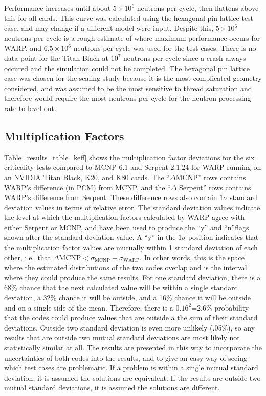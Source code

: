 \documentclass[preprint,12pt]{elsarticle}
\begin{document}
Performance increases until about $5\times10^6$ neutrons per cycle, then flattens above this for all cards.  This curve was calculated using the hexagonal pin lattice test case, and may change if a different model were input.  Despite this, $5\times10^6$ neutrons per cycle is a rough estimate of where maximum performance occurs for WARP, and $6.5\times10^6$ neutrons per cycle was used for the test cases.  There is no data point for the Titan Black at $10^7$ neutrons per cycle since a crash always occured and the simulation could not be completed.  The hexagonal pin lattice case was chosen for the scaling study because it is the most complicated geometry considered, and was assumed to be the most sensitive to thread saturation and therefore would require the most neutrons per cycle for the neutron processing rate to level out.  

\subsection{Multiplication Factors}

Table~\ref{results_table_keff} shows the multiplication factor deviations for the six criticality tests compared to MCNP 6.1 and Serpent 2.1.24 for WARP running on an NVIDIA Titan Black, K20, and K80 cards.  The ``$\Delta$MCNP'' rows contains WARP's difference (in PCM) from MCNP, and the ``$\Delta$ Serpent'' rows contains WARP's difference from Serpent.  These difference rows also contain $1\sigma$ standard deviation values in terms of relative error. The standard deviation values indicate the level at which the multiplication factors calculated by WARP agree with either Serpent or MCNP, and have been used to produce the ``y'' and ``n''flags shown after the standard deviation value.  A ``y'' in the $1\sigma$ position indicates that the multiplication factor values are mutually within 1 standard deviation of each other, i.e.\ that $\Delta \textrm{MCNP}<\sigma_{\textrm{MCNP}}+\sigma_{\textrm{WARP}}$.  In other words, this is the space where the estimated distributions of the two codes overlap and is the interval where they could produce the same results.  For one standard deviation, there is a 68\% chance that the next calculated value will be within a single standard deviation, a 32\% chance it will be outside, and a 16\% chance it will be outside and on a single side of the mean.  Therefore, there is a $0.16^2$=2.6\% probability that the codes could produce values that are outside a the sum of their standard deviations.  Outside two standard deviation is even more unlikely (.05\%), so any results that are outside two mutual standard deviations are most likely not statistically similar at all.  The results are presented in this way to incorporate the uncertainties of both codes into the results, and to give an easy way of seeing which test cases are problematic.  If a problem is within a single mutual standard deviation, it is assumed the solutions are equivalent.  If the results are outside two mutual standard deviations, it is assumed the solutions are different.
\end{document}
